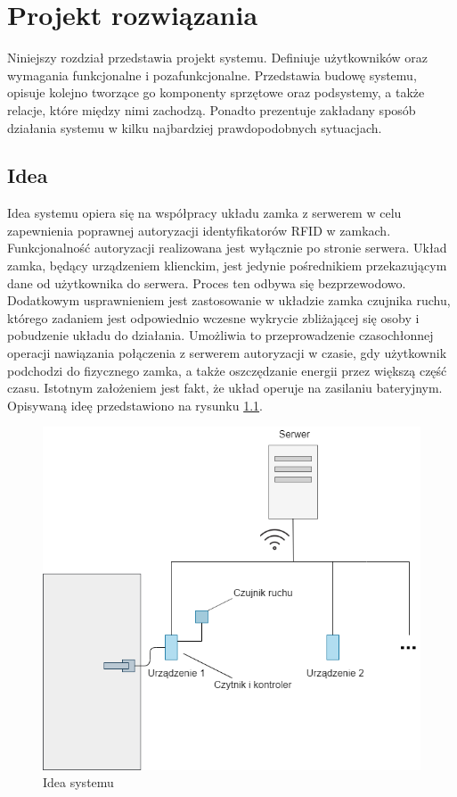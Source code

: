 \chapter{Projekt rozwiązania}
\label{chap:hl-arch}

    Niniejszy rozdział przedstawia projekt systemu. Definiuje użytkowników oraz wymagania funkcjonalne i pozafunkcjonalne. Przedstawia budowę systemu, opisuje kolejno tworzące go komponenty sprzętowe oraz podsystemy, a także relacje, które między nimi zachodzą. Ponadto prezentuje zakładany sposób działania systemu w kilku najbardziej prawdopodobnych sytuacjach.

    \section{Idea}
        Idea systemu opiera się na współpracy układu zamka z serwerem w celu zapewnienia poprawnej autoryzacji identyfikatorów RFID w zamkach. Funkcjonalność autoryzacji realizowana jest wyłącznie po stronie serwera. Układ zamka, będący urządzeniem klienckim, jest jedynie pośrednikiem przekazującym dane od użytkownika do serwera. Proces ten odbywa się bezprzewodowo. Dodatkowym usprawnieniem jest zastosowanie w układzie zamka czujnika ruchu, którego zadaniem jest odpowiednio wczesne wykrycie zbliżającej się osoby i pobudzenie układu do działania. Umożliwia to przeprowadzenie czasochłonnej operacji nawiązania połączenia z serwerem autoryzacji w czasie, gdy użytkownik podchodzi do fizycznego zamka, a także oszczędzanie energii przez większą część czasu. Istotnym założeniem jest fakt, że układ operuje na zasilaniu bateryjnym. Opisywaną ideę przedstawiono na rysunku \ref{fig:door}.

        \begin{figure}[h!]
            \begin{center}
                \includegraphics[width=.8\linewidth]{chapters/images/door2.png}
                \caption{Idea systemu}
                \label{fig:door}
            \end{center}
        \end{figure}

